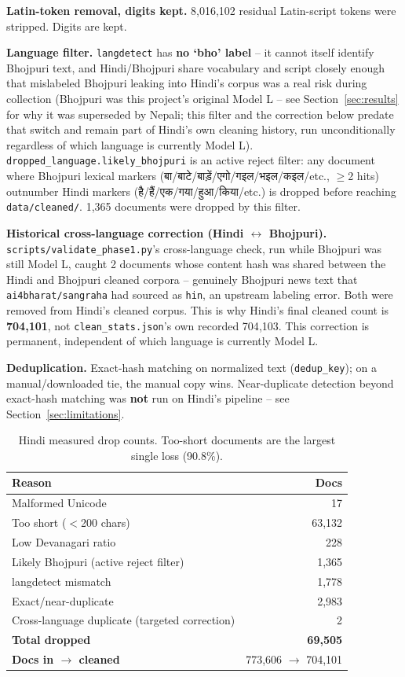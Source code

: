 \documentclass[11pt]{article}
\newcommand{\dn}[1]{{\devanagarifont #1}}
\begin{document}
\textbf{Latin-token removal, digits kept.} 8{,}016{,}102 residual
Latin-script tokens were stripped. Digits are kept.

\textbf{Language filter.} \texttt{langdetect} has \textbf{no `bho' label}
-- it cannot itself identify Bhojpuri text, and Hindi/Bhojpuri share
vocabulary and script closely enough that mislabeled Bhojpuri leaking
into Hindi's corpus was a real risk during collection (Bhojpuri was this
project's original Model L -- see Section~\ref{sec:results} for why it
was superseded by Nepali; this filter and the correction below predate
that switch and remain part of Hindi's own cleaning history, run
unconditionally regardless of which language is currently Model L).
\texttt{dropped\_language.likely\_bhojpuri} is an active reject filter:
any document where Bhojpuri lexical markers
(\dn{बा}/\dn{बाटे}/\dn{बाड़ें}/\dn{एगो}/\dn{गइल}/\dn{भइल}/\dn{कइल}/etc.,
$\geq$2 hits) outnumber Hindi markers
(\dn{है}/\dn{हैं}/\dn{एक}/\dn{गया}/\dn{हुआ}/\dn{किया}/etc.) is dropped
before reaching \texttt{data/cleaned/}. 1{,}365 documents were dropped by
this filter.

\textbf{Historical cross-language correction (Hindi $\leftrightarrow$
Bhojpuri).} \texttt{scripts/validate\_phase1.py}'s cross-language check,
run while Bhojpuri was still Model L, caught 2 documents whose content
hash was shared between the Hindi and Bhojpuri cleaned corpora --
genuinely Bhojpuri news text that \texttt{ai4bharat/sangraha} had sourced
as \texttt{hin}, an upstream labeling error. Both were removed from
Hindi's cleaned corpus. This is why Hindi's final cleaned count is
\textbf{704{,}101}, not \texttt{clean\_stats.json}'s own recorded
704{,}103. This correction is permanent, independent of which language is
currently Model L.

\textbf{Deduplication.} Exact-hash matching on normalized text
(\texttt{dedup\_key}); on a manual/downloaded tie, the manual copy wins.
Near-duplicate detection beyond exact-hash matching was \textbf{not} run
on Hindi's pipeline -- see Section~\ref{sec:limitations}.

\begin{table}[htbp]
\centering
\begin{tabular}{lr}
\toprule
Reason & Docs \\
\midrule
Malformed Unicode & 17 \\
Too short ($<$200 chars) & 63{,}132 \\
Low Devanagari ratio & 228 \\
Likely Bhojpuri (active reject filter) & 1{,}365 \\
langdetect mismatch & 1{,}778 \\
Exact/near-duplicate & 2{,}983 \\
Cross-language duplicate (targeted correction) & 2 \\
\midrule
\textbf{Total dropped} & \textbf{69{,}505} \\
\textbf{Docs in $\to$ cleaned} & 773{,}606 $\to$ 704{,}101 \\
\bottomrule
\end{tabular}
\caption{Hindi measured drop counts. Too-short documents are the largest single loss (90.8\%).}
\end{table}
\end{document}
